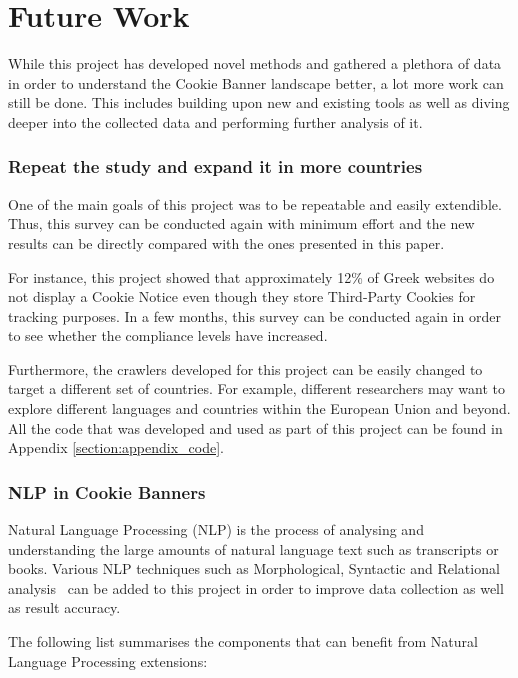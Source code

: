 \documentclass[../main.tex]{subfiles}
\begin{document}
\section{Future Work}
While this project has developed novel methods and gathered a plethora of data in order to understand the Cookie Banner landscape better, a lot more work can still be done. This includes building upon new and existing tools as well as diving deeper into the collected data and performing further analysis of it.

\subsubsection{Repeat the study and expand it in more countries}
One of the main goals of this project was to be repeatable and easily extendible. Thus, this survey can be conducted again with minimum effort and the new results can be directly compared with the ones presented in this paper. 

For instance, this project showed that approximately 12\% of Greek websites do not display a Cookie Notice even though they store Third-Party Cookies for tracking purposes. In a few months, this survey can be conducted again in order to see whether the compliance levels have increased. 

Furthermore, the crawlers developed for this project can be easily changed to target a different set of countries. For example, different researchers may want to explore different languages and countries within the European Union and beyond. All the code that was developed and used as part of this project can be found in Appendix \ref{section:appendix_code}.

\subsubsection{NLP in Cookie Banners}
Natural Language Processing (NLP) is the process of analysing and understanding the large amounts of natural language text such as transcripts or books. Various NLP techniques such as Morphological, Syntactic and Relational analysis~\cite{manning2014stanford} can be added to this project in order to improve data collection as well as result accuracy. 

The following list summarises the components that can benefit from Natural Language Processing extensions:
\end{document}

